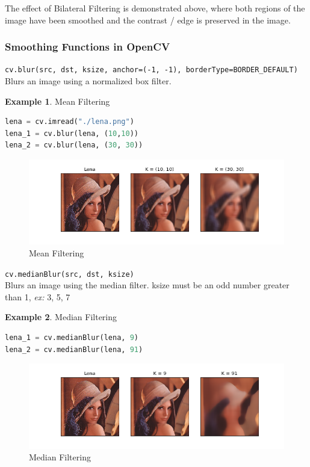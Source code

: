 \documentclass{article}
\theoremstyle{definition}
\newtheorem{ex}{Example}[subsection]
\theoremstyle{remark}
\newcommand{\func}[2]{\noindent\lstinline{#1}\\#2}
\begin{document}
The effect of Bilateral Filtering is demonstrated above, where both regions of the image have been smoothed and the contrast / edge is preserved in the image.


\break


\subsubsection{Smoothing Functions in OpenCV}

\func{cv.blur(src, dst, ksize, anchor=(-1, -1), borderType=BORDER_DEFAULT)}{
Blurs an image using a normalized box filter.
}

\begin{ex} Mean Filtering
\begin{lstlisting}[language=Python]
lena = cv.imread("./lena.png")
lena_1 = cv.blur(lena, (10,10))
lena_2 = cv.blur(lena, (30, 30))
\end{lstlisting}
\begin{figure}[h!]
    \centering
    \includegraphics[width=\textwidth]{ocv_mean_filtering}
    \caption{Mean Filtering}
    \label{fig:ocv_mean_filt}
\end{figure}
\end{ex}

\func{cv.medianBlur(src, dst, ksize)}{
Blurs an image using the median filter. ksize must be an odd number greater than 1, \textit{ex:} 3, 5, 7}

\begin{ex} Median Filtering
\begin{lstlisting}[language=Python]
lena_1 = cv.medianBlur(lena, 9)
lena_2 = cv.medianBlur(lena, 91)
\end{lstlisting}
\begin{figure}[h!]
    \centering
    \includegraphics[width=\textwidth]{ocv_median_filtering}
    \caption{Median Filtering
    }
    \label{fig:ocv_median_filt}
\end{figure}
\end{ex}
\end{document}
